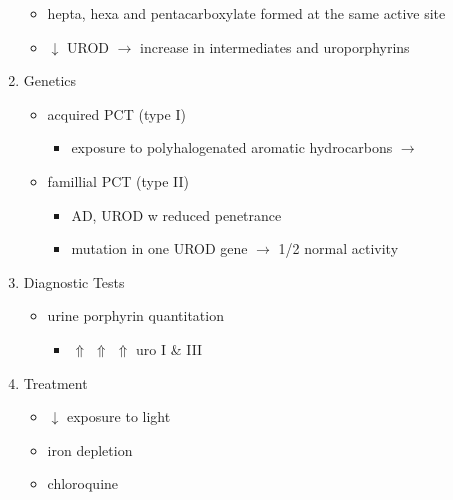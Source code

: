 \documentclass{scrartcl}
\begin{document}
\begin{enumerate}
\begin{itemize}
\item hepta, hexa and pentacarboxylate formed at the same active site
\item \(\downarrow\) UROD \(\to\) increase in intermediates and uroporphyrins
\end{itemize}
\item Genetics
\label{sec:org4a3d469}
\begin{itemize}
\item acquired PCT (type I)
\begin{itemize}
\item exposure to polyhalogenated aromatic hydrocarbons \(\to\)
\end{itemize}
\item famillial PCT (type II)
\begin{itemize}
\item AD, UROD w reduced penetrance
\item mutation in one UROD gene \(\to\) 1/2 normal activity
\end{itemize}
\end{itemize}
\item Diagnostic Tests
\label{sec:org0b11948}
\begin{itemize}
\item urine porphyrin quantitation
\begin{itemize}
\item \(\Uparrow\) \(\Uparrow\) \(\Uparrow\) uro I \& III
\end{itemize}
\end{itemize}
\item Treatment
\label{sec:orgb36c4e5}
\begin{itemize}
\item \(\downarrow\) exposure to light
\item iron depletion
\item chloroquine
\end{itemize}
\end{enumerate}
\end{document}
